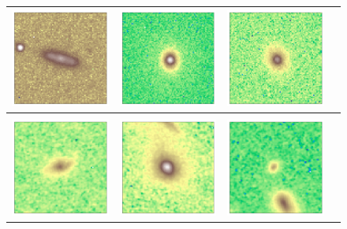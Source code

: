 \begin{figure}[htbp]
\begin{center}
\begin{tabular}{cccc}
     \includegraphics[width=3.25cm,height=3.25cm]{587722983369408606.pdf} & \includegraphics[width=3.25cm,height=3.25cm]{587724198278725806.pdf} & \includegraphics[width=3.25cm,height=3.25cm]{587724232641937529.pdf}
     &
     \\[0.3cm]
     \hline
     \\
      \includegraphics[width=3.25cm,height=3.25cm]{goodsn_93.pdf} & \includegraphics[width=3.25cm,height=3.25cm]{goodsn_750.pdf} & \includegraphics[width=3.25cm,height=3.25cm]{goodsn_88.pdf} &

\end{tabular}
\end{center}
\end{figure}
